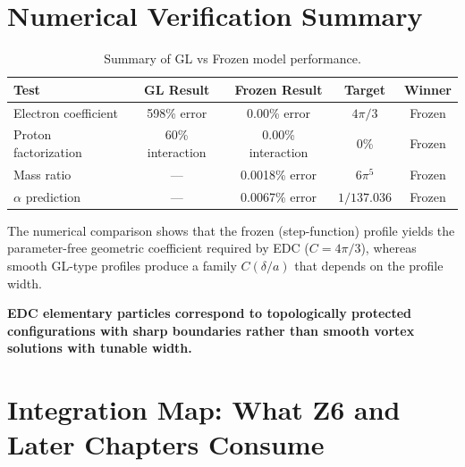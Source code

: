 \section{Numerical Verification Summary}
\label{sec:ch2_numerical}

\begin{table}[H]
\centering
\begin{tabular}{lcccc}
\toprule
\textbf{Test} & \textbf{GL Result} & \textbf{Frozen Result} & \textbf{Target} & \textbf{Winner} \\
\midrule
Electron coefficient & 598\% error & 0.00\% error & $4\pi/3$ & Frozen \\
Proton factorization & 60\% interaction & 0.00\% interaction & 0\% & Frozen \\
Mass ratio & --- & 0.0018\% error & $6\pi^5$ & Frozen \\
$\alpha$ prediction & --- & 0.0067\% error & $1/137.036$ & Frozen \\
\bottomrule
\end{tabular}
\caption{Summary of GL vs Frozen model performance.}
\label{tab:ch2_verification_summary}
\end{table}

\begin{tcolorbox}[colback=green!5!white, colframe=green!50!black,
    title=\textbf{Conclusion}]
The numerical comparison shows that the frozen (step-function) profile yields the
parameter-free geometric coefficient required by EDC ($C=4\pi/3$), whereas smooth
GL-type profiles produce a family $C(\delta/a)$ that depends on the profile width.

\textbf{EDC elementary particles correspond to topologically protected configurations
with sharp boundaries rather than smooth vortex solutions with tunable width.}
\end{tcolorbox}


\section{Integration Map: What Z6 and Later Chapters Consume}
\label{sec:ch2_integration_map}

